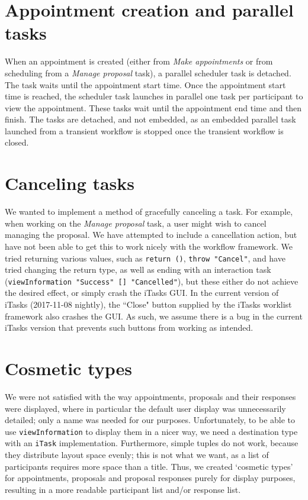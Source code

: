 \documentclass{article}
\begin{document}
    \section{Appointment creation and parallel tasks}
	When an appointment is created (either from \emph{Make appointments} or from scheduling from a \emph{Manage proposal} task), a parallel scheduler task is detached.
	The task waits until the appointment start time.
	Once the appointment start time is reached, the scheduler task launches in parallel one task per participant to view the appointment.
	These tasks wait until the appointment end time and then finish.
	The tasks are detached, and not embedded, as an embedded parallel task launched from a transient workflow is stopped once the transient workflow is closed.
    
    \section{Canceling tasks}
	We wanted to implement a method of gracefully canceling a task.
	For example, when working on the \emph{Manage proposal} task, a user might wish to cancel managing the proposal.
	We have attempted to include a cancellation action, but have not been able to get this to work nicely with the workflow framework.
	We tried returning various values, such as \lstinline|return ()|, \lstinline|throw "Cancel"|, and have tried changing the return type, as well as ending with an interaction task (\lstinline|viewInformation "Success" [] "Cancelled"|), but these either do not achieve the desired effect, or simply crash the iTasks GUI.
	In the current version of iTasks (2017-11-08 nightly), the ``Close" button supplied by the iTasks worklist framework also crashes the GUI.
	As such, we assume there is a bug in the current iTasks version that prevents such buttons from working as intended.
    
    \section{Cosmetic types}
	We were not satisfied with the way appointments, proposals and their responses were displayed, where in particular the default user display was unnecessarily detailed; only a name was needed for our purposes.
    Unfortunately, to be able to use \lstinline|viewInformation| to display them in a nicer way, we need a destination type with an \lstinline|iTask| implementation.
    Furthermore, simple tuples do not work, because they distribute layout space evenly; this is not what we want, as a list of participants requires more space than a title.
    Thus, we created `cosmetic types' for appointments, proposals and proposal responses purely for display purposes, resulting in a more readable participant list and/or response list.
	
\end{document}

